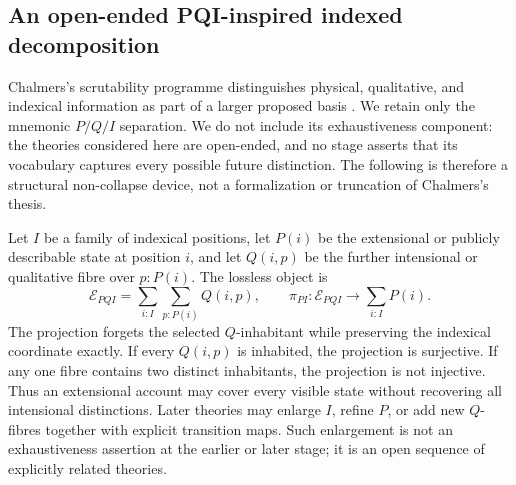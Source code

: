 \documentclass[11pt]{article}
\theoremstyle{definition}
\theoremstyle{remark}
\begin{document}
\subsection{An open-ended PQI-inspired indexed decomposition}

Chalmers's scrutability programme distinguishes physical, qualitative, and
indexical information as part of a larger proposed basis
\cite{ChalmersConstructing}.  We retain only the mnemonic $P/Q/I$ separation.
We do not include its exhaustiveness component: the theories considered here
are open-ended, and no stage asserts that its vocabulary captures every possible
future distinction.  The following is therefore a structural non-collapse
device, not a formalization or truncation of Chalmers's thesis.

Let $I$ be a family of indexical positions, let $P(i)$ be the extensional or
publicly describable state at position $i$, and let $Q(i,p)$ be the further
intensional or qualitative fibre over $p:P(i)$.  The lossless object is
\[
  \mathcal E_{PQI}=\sum_{i:I}\sum_{p:P(i)}Q(i,p),
  \qquad
  \pi_{PI}:\mathcal E_{PQI}\longrightarrow\sum_{i:I}P(i).
\]
The projection forgets the selected $Q$-inhabitant while preserving the
indexical coordinate exactly.  If every $Q(i,p)$ is inhabited, the projection
is surjective.  If any one fibre contains two distinct inhabitants, the
projection is not injective.  Thus an extensional account may cover every
visible state without recovering all intensional distinctions.  Later theories
may enlarge $I$, refine $P$, or add new $Q$-fibres together with explicit
transition maps.  Such enlargement is not an exhaustiveness assertion at the
earlier or later stage; it is an open sequence of explicitly related theories.
\end{document}
